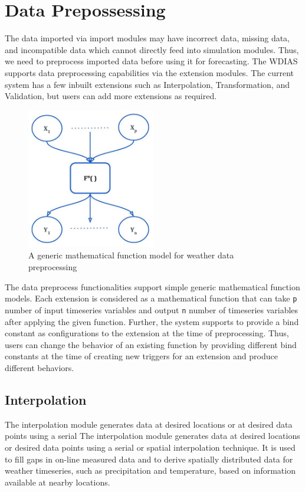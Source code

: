 \section{Data Prepossessing}
\label{se:data_preprocess}

The data imported via import modules may have incorrect data, missing data, and incompatible data which cannot directly feed into simulation modules.
Thus, we need to preprocess imported data before using it for forecasting. The WDIAS supports data preprocessing capabilities via the extension modules. The current system has a few inbuilt extensions such as Interpolation, Transformation, and Validation, but users can add more extensions as required.

\begin{figure}[htp]
    \centering
    \includegraphics[width=0.5\textwidth]{method/data_preprocess/weather_data_preprocessing.jpg}
    \caption{A generic mathematical function model for weather data preprocessing}
    \label{fi:weather_data_preprocessing}
\end{figure}

The data preprocess functionalities support simple generic mathematical function models. Each extension is considered as a mathematical function that can take \texttt{p} number of input timeseries variables and output \texttt{n} number of timeseries variables after applying the given function. Further, the system supports to provide a bind constant as configurations to the extension at the time of preprocessing. Thus, users can change the behavior of an existing function by providing different bind constants at the time of creating new triggers for an extension and produce different behaviors.

\subsection{Interpolation}
The interpolation module generates data at desired locations or at desired data points using a serial The interpolation module generates data at desired locations or desired data points using a serial or spatial interpolation technique. It is used to fill gaps in on-line measured data and to derive spatially distributed data for weather timeseries, such as precipitation and temperature, based on information available at nearby locations.

